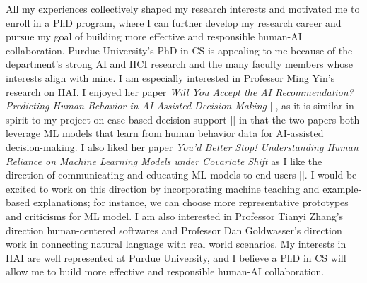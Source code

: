 


All my experiences collectively shaped my research interests and motivated me to enroll in a PhD program, where I can further develop my research career and pursue my goal of building more effective and responsible human-AI collaboration. 
Purdue University's PhD in CS is appealing to me because of the department's strong AI and HCI research and the many faculty members whose interests align with mine.
I am especially interested in Professor Ming Yin's research on HAI. I enjoyed her paper \textit{Will You Accept the AI Recommendation? Predicting Human Behavior in AI-Assisted Decision Making} [], as it is similar in spirit to my project on case-based decision support [] in that the two papers both leverage ML models that learn from human behavior data for AI-assisted decision-making. I also liked her paper \textit{You’d Better Stop! Understanding Human Reliance on Machine Learning Models under Covariate Shift} as I like the direction of communicating and educating ML models to end-users []. I would be excited to work on this direction by incorporating machine teaching and example-based explanations; for instance, we can choose more representative prototypes and criticisms for ML model.
I am also interested in Professor Tianyi Zhang's direction human-centered softwares and Professor Dan Goldwasser's direction work in connecting natural language with real world scenarios.
My interests in HAI are well represented at Purdue University, and I believe a PhD in CS will allow me to build more effective and responsible human-AI collaboration.
